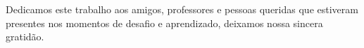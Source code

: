 ﻿%
\newpage
\thispagestyle{empty}
\vspace*{\fill}
\begin{flushright}
  \begin{minipage}{0.5\textwidth}
    \normalsize
    Dedicamos este trabalho aos amigos, professores e pessoas queridas que estiveram
     presentes nos momentos de desafio e aprendizado, deixamos nossa sincera gratidão.
  \end{minipage}
\end{flushright}

